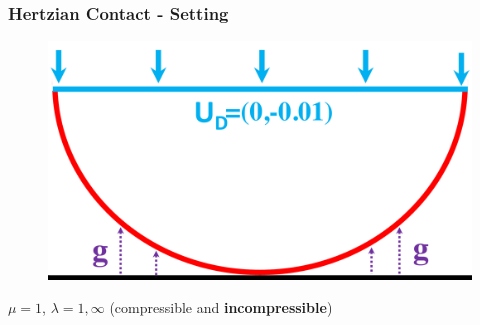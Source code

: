\documentclass[8pt, oneside]{beamer}   	%
\newcommand{\titlecolor}[1]{\frametitle{\textcolor{dkgrey}{ \textbf{#1}}}}
\begin{document}
\begin{frame}
\titlecolor{Hertzian Contact - Setting}
\begin{figure}[htbp!]
\includegraphics[scale=0.2]{img/signorinicircle.pdf} 
\end{figure}
$ \mu = 1$, $ \lambda = 1, \infty$ (compressible and \textbf{incompressible})
\end{frame}

\end{document}
